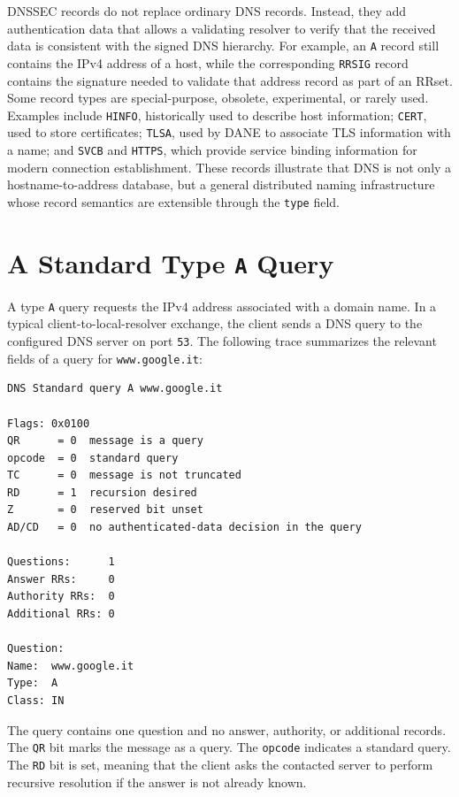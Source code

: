 \documentclass{scrbook}
\begin{document}
	DNSSEC records do not replace ordinary DNS records. Instead, they add authentication data that allows a validating resolver to verify that the received data is consistent with the signed DNS hierarchy. For example, an \texttt{A} record still contains the IPv4 address of a host, while the corresponding \texttt{RRSIG} record contains the signature needed to validate that address record as part of an RRset.\\
	
	Some record types are special-purpose, obsolete, experimental, or rarely used. Examples include \texttt{HINFO}, historically used to describe host information; \texttt{CERT}, used to store certificates; \texttt{TLSA}, used by DANE to associate TLS information with a name; and \texttt{SVCB} and \texttt{HTTPS}, which provide service binding information for modern connection establishment. These records illustrate that DNS is not only a hostname-to-address database, but a general distributed naming infrastructure whose record semantics are extensible through the \texttt{type} field.
	
	\newpage
	\section{A Standard Type \texttt{A} Query}
	
	A type \texttt{A} query requests the IPv4 address associated with a domain name. In a typical client-to-local-resolver exchange, the client sends a DNS query to the configured DNS server on port \texttt{53}. The following trace summarizes the relevant fields of a query for \texttt{www.google.it}:
	\begin{lstlisting}
DNS Standard query A www.google.it

Flags: 0x0100
QR      = 0  message is a query
opcode  = 0  standard query
TC      = 0  message is not truncated
RD      = 1  recursion desired
Z       = 0  reserved bit unset
AD/CD   = 0  no authenticated-data decision in the query

Questions:      1
Answer RRs:     0
Authority RRs:  0
Additional RRs: 0

Question:
Name:  www.google.it
Type:  A
Class: IN
	\end{lstlisting}
	
	The query contains one question and no answer, authority, or additional records. The \texttt{QR} bit marks the message as a query. The \texttt{opcode} indicates a standard query. The \texttt{RD} bit is set, meaning that the client asks the contacted server to perform recursive resolution if the answer is not already known.\\
	
\end{document}
